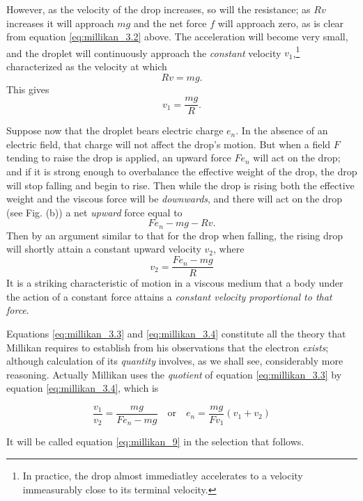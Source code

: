 However, as the velocity of the drop increases, so will the resistance;
as $Rv$ increases it will approach $mg$ and the net force
$f$ will approach zero, as is clear from equation \eqref{eq:millikan_3.2} above. The
acceleration will become very small, and the droplet will continuously 
approach the \emph{constant} velocity $v_1$,\footnote{In practice, the drop
almost immediatley accelerates to a velocity immeasurably close to its terminal 
velocity.} characterized as the velocity at which
\begin{equation*}
Rv = mg.
\end{equation*}
%
This gives
\begin{equation*}\tag{3.3}
v_1 = \frac{mg}{R}. \label{eq:millikan_3.3}
\end{equation*}

Suppose now that the droplet bears electric charge $e_n$. In the
absence of an electric field, that charge will not affect the drop's
motion. But when a field $F$ tending to raise the drop is applied,
an upward force $Fe_n$ will act on the drop; and if it is strong
enough to overbalance the effective weight of the drop, the drop will
stop falling and begin to rise. Then while the drop is rising both the
effective weight and the viscous force will be \emph{downwards}, and
there will act on the drop (see Fig. (b)) a net \emph{upward} force
equal to
\begin{equation*}
Fe_n - mg - Rv.
\end{equation*}
Then by an argument similar to that for the drop when falling, the
rising drop will shortly attain a constant upward velocity $v_2$,
where
\begin{equation*}\tag{3.4}
v_2=\frac{Fe_n - mg}{R} \label{eq:millikan_3.4}
\end{equation*}
It is a striking characteristic of motion in a viscous medium that a
body under the action of a constant force attains a \emph{constant
velocity proportional to that force}.

Equations \eqref{eq:millikan_3.3} and \eqref{eq:millikan_3.4} constitute all the theory that Millikan
requires to establish from his observations that the electron
\emph{exists}; although calculation of its \emph{quantity} involves, as
we shall see, considerably more reasoning. Actually Millikan uses the
\emph{quotient} of equation \eqref{eq:millikan_3.3} by equation \eqref{eq:millikan_3.4}, which is
\begin{center}
\begin{equation*}\tag{1}
\frac{v_1}{v_2} = \frac{mg}{Fe_n - mg} \quad\text{or}\quad  e_n = \frac{mg}{Fv_1}(v_1 + v_2)
\end{equation*}
\end{center}
It will be called equation \eqref{eq:millikan_9} in the selection that follows.

